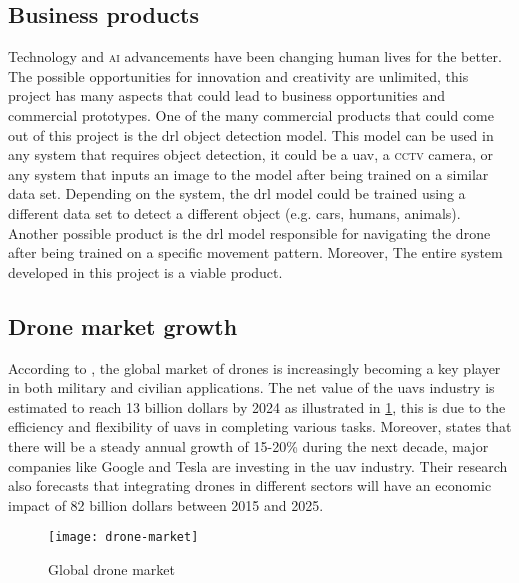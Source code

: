 \documentclass[../main.tex]{subfiles}
\begin{document}
\subsection{Business products}
        Technology and \textsc{ai} advancements have been changing human lives for the better.
	The possible opportunities for innovation and creativity are unlimited, this
	project has many aspects that could lead to business opportunities and commercial
	prototypes. 
	One of the many commercial products that could come out of this project is
	the \gls{drl} object detection model. This model can be used in any system
	that requires object detection, it could be a \gls{uav}, a \textsc{cctv} camera, or
	any system that inputs an image to the model after being trained on a similar 
	data set.
	Depending on the system, the \gls{drl} model could be trained using a different
	data set to detect a different object (e.g. cars, humans, animals).
	Another possible product is the \gls{drl} model responsible for navigating the
	drone after being trained on a specific movement pattern.
	Moreover, The entire system developed in this project is a viable product.
	
\subsection{Drone market growth}
	According to \citeauthor{Atwater15Commercial}, the global market of drones is 
	increasingly becoming a key player in both military and civilian applications.
	The net value of the \glspl{uav} industry is estimated to reach 13 billion dollars
	by 2024 as illustrated in \cref{fig:drone-market}, this is due to the efficiency 
	and flexibility of \glspl{uav} in completing various tasks. 
	Moreover, \citeauthor{Yes19} states that there will be a steady annual growth of 
	15-20\% during the next decade, major companies like Google and Tesla are investing
	in the \gls{uav} industry. Their research also forecasts that integrating drones in
	different sectors will have an economic impact of 82 billion dollars between 2015 
	and 2025.
	 
	
	
	\begin{figure}[tbp] 
		\centering
		\texttt{[image: drone-market]} 
		\caption{Global drone market} \label{fig:drone-market} 
	\end{figure}
	
	
\end{document}
